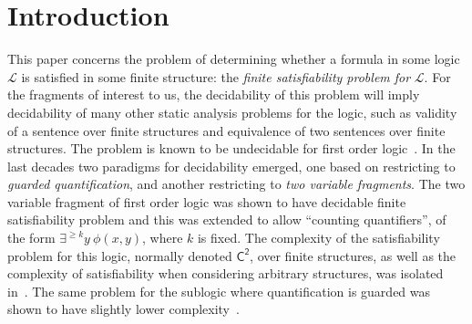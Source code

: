 \documentclass[10pt,a4paper]{article}
\theoremstyle{definition}
\theoremstyle{remark}
\newcommand{\Ctwo}    {\mathsf{C^2}}
\begin{document}
\section{Introduction}\label{sec:intro}
This paper concerns the  problem of determining whether a formula in some logic $\mathcal{L}$ is satisfied in some finite structure: the \emph{finite satisfiability problem for} $\mathcal{L}$. For the fragments of interest to us, the decidability of this problem will imply decidability of many other static analysis problems for the logic, such as validity of a sentence over finite structures and equivalence of two sentences over finite structures.
The problem is known
to be undecidable for first order logic~\cite{traktenbrot}. 
In the last decades two paradigms for decidability emerged, one based on restricting to \emph{guarded quantification}, and another restricting to \emph{two variable fragments}.
The two variable fragment of first order logic was shown to have decidable finite satisfiability problem and this was extended to allow ``counting quantifiers'',  of the form $\exists^{\ge k} y ~ \phi(x,y)$, where $k$ is fixed. The complexity of the satisfiability problem for this logic, normally denoted $\Ctwo$, over finite structures, as well as the complexity of satisfiability when considering arbitrary structures, was isolated in~\cite{ctwocomplexity}. The same problem for the sublogic where quantification is guarded was shown 
to have slightly lower complexity~\cite{gctwocomplexity}.
\end{document}
